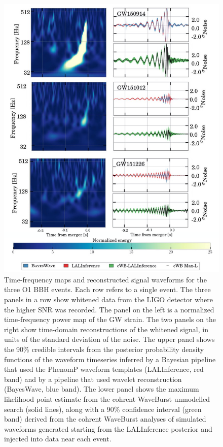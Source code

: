 \documentclass[binding=0.6cm, LaM]{sapthesis}
\begin{document}
        \begin{figure}[!t]
          \label{o1}
          \includegraphics[scale=0.4]{o1}
          \centering
          \caption{Time-frequency maps and reconstructed signal waveforms for the three O1 BBH events. Each row refers to a single event.  The three panels in a row show whitened data from the LIGO detector where the higher SNR was recorded. The panel on the left is a normalized time-frequency power map of the GW strain.  The two panels on the right show time-domain reconstructions of the whitened signal, in units of the standard deviation of the noise. The upper panel shows the 90\% credible intervals from the posterior probability density functions of the waveform timeseries inferred by a Bayesian pipeline that used the PhenomP waveform templates ({\ttfamily LALInference}, red band) and by a pipeline that used wavelet reconstruction ({\ttfamily BayesWave}, blue band).  The lower panel shows the maximum likelihood point estimate from the {\ttfamily cohrent WaveBurst} unmodelled search (solid lines), along with a 90\% confidence interval (green band) derived from the {\ttfamily cohrent WaveBurst} analyses of simulated waveforms generated starting from the {\ttfamily LALInference} posterior and injected into data near each event. \cite{13}}
          \label{fig:o1}
        \end{figure}
\end{document}
